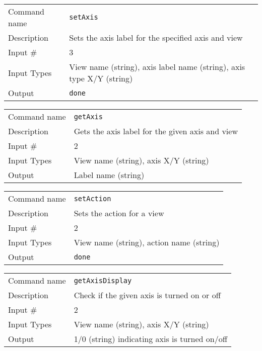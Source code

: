 \bigskip

\noindent
\begin{tabular}{l|p{5in}}
\hline
Command name & {\tt setAxis} \\
Description  & Sets the axis label for the specified axis and view \\
Input \#     & 3 \\
Input Types  & View name (string), axis label name (string),
               axis type X/Y (string) \\
Output       & {\tt done} \\
\hline
\end{tabular}

\bigskip

\noindent
\begin{tabular}{l|p{5in}}
\hline
Command name & {\tt getAxis} \\
Description  & Gets the axis label for the given axis and view \\
Input \#     & 2 \\
Input Types  & View name (string), axis X/Y (string) \\
Output       & Label name (string) \\
\hline
\end{tabular}

\bigskip

\noindent
\begin{tabular}{l|p{5in}}
\hline
Command name & {\tt setAction} \\
Description  & Sets the action for a view \\
Input \#     & 2 \\
Input Types  & View name (string), action name (string) \\
Output       & {\tt done} \\
\hline
\end{tabular}

\bigskip

\noindent
\begin{tabular}{l|p{5in}}
\hline
Command name & {\tt getAxisDisplay} \\
Description  & Check if the given axis is turned on or off \\
Input \#     & 2 \\
Input Types  & View name (string), axis  X/Y (string) \\
Output       & 1/0 (string) indicating axis is turned on/off \\
\hline
\end{tabular}

